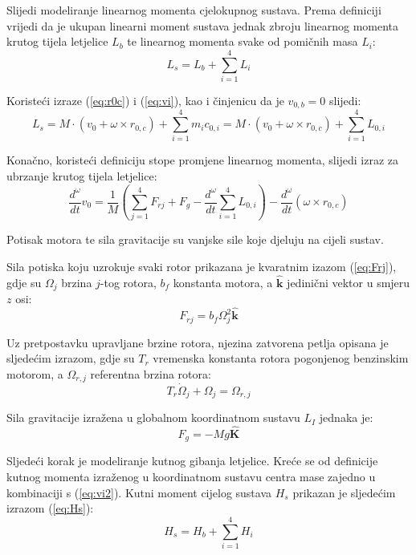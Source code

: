 \documentclass[11pt,a4paper]{article}
\begin{document}
Slijedi modeliranje linearnog momenta cjelokupnog sustava. Prema definiciji vrijedi da je ukupan linearni moment sustava jednak zbroju linearnog momenta krutog tijela letjelice $L_{b}$ te linearnog momenta svake od pomičnih masa $L_{i}$:
\begin{equation}
L_{s} = L_{b} + \sum_{i=1}^{4}L_{i}
\label{eq:Ls}
\end{equation}

Koristeći izraze (\ref{eq:r0c}) i (\ref{eq:vi}), kao i činjenicu da je $v_{0,b} = 0$ slijedi:
\begin{equation}
L_{s} = M \cdot (v_{0} + \omega \times r_{0,c}) + \sum_{i=1}^{4}m_{i}c_{0,i} = M \cdot (v_{0} + \omega \times r_{0,c}) + \sum_{i=1}^{4}L_{0,i}
\label{eq:Ls2}
\end{equation}

Konačno, koristeći definiciju stope promjene linearnog momenta, slijedi izraz za ubrzanje krutog tijela letjelice:
\begin{equation}
\frac{d^{\omega}}{dt} v_{0} = \frac{1}{M} \left( \sum_{j=1}^{4} F_{rj} + F_{g} - \frac{d^{\omega}}{dt} \sum_{i=1}^{4}L_{0,i}  \right) - \frac{d^{\omega}}{dt} (\omega \times r_{0,c})
\label{eq:v0dot}
\end{equation}

Potisak motora te sila gravitacije su vanjske sile koje djeluju na cijeli sustav.

Sila potiska koju uzrokuje svaki rotor prikazana je kvaratnim izazom (\ref{eq:Frj}), gdje su $\Omega_{j}$ brzina $j$-tog rotora, $b_{f}$ konstanta motora, a  $\bm{\hat{k}}$ jedinični vektor u smjeru $z$ osi:
\begin{equation}
F_{rj} = b_{f}\Omega_{j}^{2} \bm{\hat{k}}
\label{eq:Frj}
\end{equation}


Uz pretpostavku upravljane brzine rotora, njezina zatvorena petlja opisana je sljedećim izrazom, gdje su $T_{r}$ vremenska konstanta rotora pogonjenog benzinskim motorom, a $\Omega_{r,j}$ referentna brzina rotora:
\begin{equation}
T_{r}\dot{\Omega}_{j} + \Omega_{j} = \Omega_{r,j}
\label{eq:omega_rj}
\end{equation}

Sila gravitacije izražena u globalnom koordinatnom sustavu $L_{I}$ jednaka je:
\begin{equation}
F_{g} = -Mg \bm{\hat{K}}
\label{eq:Fg}
\end{equation}


Sljedeći korak je modeliranje kutnog gibanja letjelice. Kreće se od definicije kutnog momenta izraženog u koordinatnom sustavu centra mase zajedno u kombinaciji s (\ref{eq:vi2}). Kutni moment cijelog sustava $H_{s}$ prikazan je sljedećim izrazom (\ref{eq:Hs}):
\begin{equation}
H_{s} = H_{b} + \sum_{i=1}^{4}H_{i}
\label{eq:Hs}
\end{equation}
\end{document}
